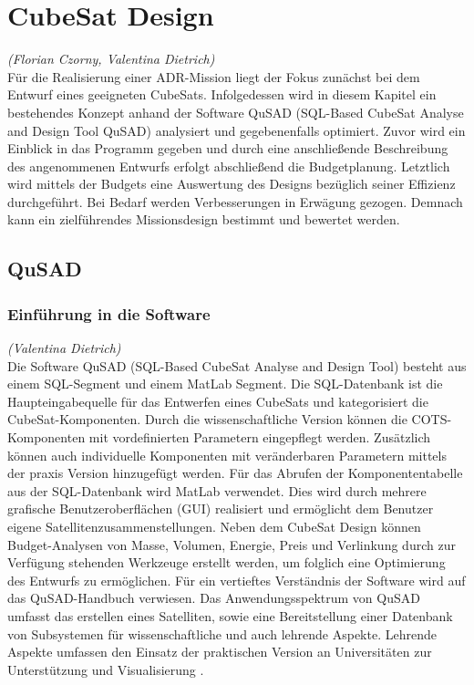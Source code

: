 \chapter{CubeSat Design}
\hfill\emph{(Florian Czorny, Valentina Dietrich)}\\

	Für die Realisierung einer ADR-Mission liegt der Fokus zunächst bei dem Entwurf eines geeigneten CubeSats. Infolgedessen wird in diesem Kapitel ein bestehendes Konzept \cite{Lettau.} anhand der Software QuSAD (SQL-Based CubeSat Analyse and Design Tool QuSAD) analysiert und gegebenenfalls optimiert. Zuvor wird ein Einblick in das Programm gegeben und durch eine anschließende Beschreibung des angenommenen Entwurfs erfolgt abschließend die Budgetplanung. Letztlich wird mittels der Budgets eine Auswertung des Designs bezüglich seiner Effizienz durchgeführt. Bei Bedarf werden Verbesserungen in Erwägung gezogen. Demnach kann ein zielführendes Missionsdesign bestimmt und bewertet werden.
		
		\section{QuSAD}
			
			\subsection{Einführung in die Software}
	\hfill\emph{(Valentina Dietrich)}\\
	
		Die Software QuSAD (SQL-Based CubeSat Analyse and Design Tool) besteht aus einem SQL-Segment und einem MatLab Segment. Die SQL-Datenbank ist die Haupteingabequelle für das Entwerfen eines CubeSats und kategorisiert die CubeSat-Komponenten. Durch die wissenschaftliche Version können die COTS-Komponenten mit vordefinierten Parametern eingepflegt werden. Zusätzlich können auch individuelle Komponenten mit veränderbaren Parametern mittels der praxis Version hinzugefügt werden. Für das Abrufen der Komponententabelle aus der SQL-Datenbank wird MatLab verwendet. Dies wird durch mehrere grafische Benutzeroberflächen (GUI) realisiert und ermöglicht dem Benutzer eigene Satellitenzusammenstellungen. Neben dem CubeSat Design können Budget-Analysen von Masse, Volumen, Energie, Preis und Verlinkung durch zur Verfügung stehenden Werkzeuge erstellt werden, um folglich eine Optimierung des Entwurfs zu ermöglichen. Für ein vertieftes Verständnis der Software wird auf das QuSAD-Handbuch \cite{Farahvashi.2016} verwiesen. Das Anwendungsspektrum von QuSAD umfasst das erstellen eines Satelliten, sowie eine Bereitstellung einer Datenbank von Subsystemen für wissenschaftliche und auch lehrende Aspekte. Lehrende Aspekte umfassen den Einsatz der praktischen Version an Universitäten zur Unterstützung und Visualisierung \cite{Farahvashi.2016b}. 
			
